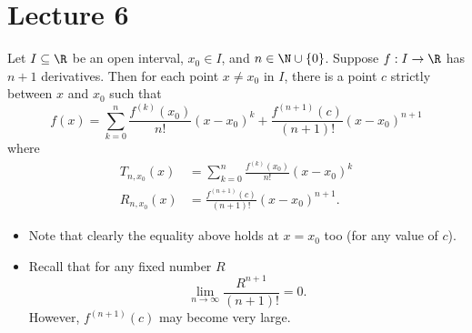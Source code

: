 \section{Lecture 6}

\begin{theorem}\label{Taylor's Theorem with Lagrange remainder}
    Let \( I \subseteq  \R   \) be an open interval, \( {x}_{0} \in I  \), and \( n \in \N \cup \{ 0  \}  \). Suppose \( f: I \to \R  \) has \( n + 1  \) derivatives. Then for each point \( x \neq {x}_{0} \) in \( I  \), there is a point \( c  \) strictly between \( x  \) and \( {x}_{0} \) such that 
    \[  f(x) = \sum_{ k=0  }^{  n } \frac{ f^{(k)}({x}_{0})  }{ n!  } (x - {x}_{0})^{k} + \frac{ f^{(n+1)}(c) }{  (n+1)! } (x - {x}_{0})^{n+1} \]
    where 
    \begin{align*}
        {T}_{n,{x}_{0}}(x) &= \sum_{ k=0  }^{ n } \frac{ f^{(k)}({x}_{0}) }{ n!  }  ( x - {x}_{0})^{k} \\
        {R}_{n,{x}_{0}}(x) &= \frac{ f^{(n+1)}(c) }{  (n+1)! }  (x - {x}_{0})^{n+1}.
    \end{align*}
\end{theorem}

\begin{remark}
    \begin{itemize}
        \item Note that clearly the equality above holds at \( x = {x}_{0} \) too (for any value of \( c  \)).
        \item Recall that for any fixed number \( R  \)
            \[ \lim_{ n \to \infty  }  \frac{ R^{n+1} }{ (n+1)! }  = 0.   \]
            However, \( f^{(n+1)}(c) \) may become very large.
    \end{itemize}
\end{remark}

